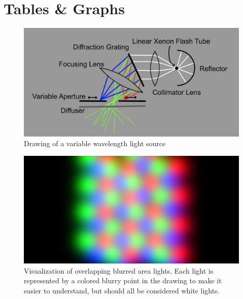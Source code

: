 \documentclass[11pt, twoside, listof=totocnumbered, bibliography=totocnumbered]{scrartcl}
\begin{document}
\section{Tables \& Graphs}
\begin{figure}[h!]
	\begin{center} 
		\includegraphics[width=1\linewidth]{variable_light_source.png}
		\caption{Drawing of a variable wavelength light source} 
		\label{variable_light_source}
	\end{center} 
\end{figure} 
\begin{figure}[h!]
	\begin{center} 
		\includegraphics[width=1\linewidth]{blurred_area_lights.jpg}
		\caption{Visualization of overlapping blurred area lights. Each light is represented by a colored blurry point in the drawing to make it easier to understand, but should all be considered white lights.} 
		\label{blurred_area_lights}
	\end{center} 
\end{figure} 
\end{document}
